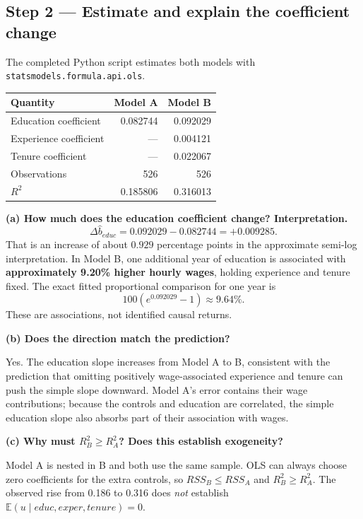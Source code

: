 \documentclass[11pt,a4paper]{article}
\newcommand{\E}{\mathbb{E}}
\begin{document}
\subsection{Step 2 --- Estimate and explain the coefficient change}
The completed Python script estimates both models with \texttt{statsmodels.formula.api.ols}.
\begin{center}
\begin{tabular}{lrr}
\toprule
Quantity & Model A & Model B\\
\midrule
Education coefficient & 0.082744 & 0.092029\\
Experience coefficient & --- & 0.004121\\
Tenure coefficient & --- & 0.022067\\
Observations & 526 & 526\\
$R^2$ & 0.185806 & 0.316013\\
\bottomrule
\end{tabular}
\end{center}
\textbf{(a) How much does the education coefficient change? Interpretation.}
\[
\Delta\widehat b_{educ}=0.092029-0.082744=\boxed{+0.009285}.
\]
That is an increase of about $0.929$ percentage points in the approximate semi-log interpretation. In Model B, one additional year of education is associated with \textbf{approximately 9.20\% higher hourly wages}, holding experience and tenure fixed. The exact fitted proportional comparison for one year is
\[
100(e^{0.092029}-1)\approx\boxed{9.64\%}.
\]
These are associations, not identified causal returns.

\textbf{(b) Does the direction match the prediction?}

Yes. The education slope increases from Model A to B, consistent with the prediction that omitting positively wage-associated experience and tenure can push the simple slope downward. Model A's error contains their wage contributions; because the controls and education are correlated, the simple education slope also absorbs part of their association with wages.

\textbf{(c) Why must $R_B^2\ge R_A^2$? Does this establish exogeneity?}

Model A is nested in B and both use the same sample. OLS can always choose zero coefficients for the extra controls, so $RSS_B\le RSS_A$ and $R_B^2\ge R_A^2$. The observed rise from 0.186 to 0.316 does \emph{not} establish $\E(u\mid educ,exper,tenure)=0$.
\end{document}
